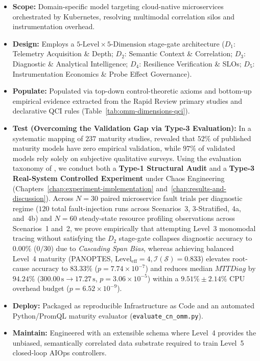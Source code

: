 \begin{itemize}
    \item \textbf{Scope:} Domain-specific model targeting cloud-native microservices orchestrated by Kubernetes, resolving multimodal correlation silos and instrumentation overhead.
    \item \textbf{Design:} Employs a $5\text{-Level} \times 5\text{-Dimension}$ stage-gate architecture ($D_1$: Telemetry Acquisition \& Depth; $D_2$: Semantic Context \& Correlation; $D_3$: Diagnostic \& Analytical Intelligence; $D_4$: Resilience Verification \& SLOs; $D_5$: Instrumentation Economics \& Probe Effect Governance).
    \item \textbf{Populate:} Populated via top-down control-theoretic axioms \cite{kalman_1960} and bottom-up empirical evidence extracted from the Rapid Review primary studies and declarative QCI rules (Table~\ref{tab:omm-dimensions-qci}).
    \item \textbf{Test (Overcoming the Validation Gap via Type-3 Evaluation):} In a systematic mapping of $237$ maturity studies,  revealed that $52\%$ of published maturity models have zero empirical validation, while $97\%$ of validated models rely solely on subjective qualitative surveys. Using the evaluation taxonomy of , we conduct both a \textbf{Type-1 Structural Audit} and a \textbf{Type-3 Real-System Controlled Experiment} under Chaos Engineering (Chapters~\ref{chap:experiment-implementation} and~\ref{chap:results-and-discussion}). Across $N=30$ paired microservice fault trials per diagnostic regime ($120$ total fault-injection runs across Scenarios~3, 3-Stratified, 4a, and~4b) and $N=60$ steady-state resource profiling observations across Scenarios~1 and~2, we prove empirically that attempting Level~3 monomodal tracing without satisfying the $D_2$ stage-gate collapses diagnostic accuracy to $0.00\%$ ($0/30$) due to \textit{Cascading Span Bias}, whereas achieving balanced Level~4 maturity (PANOPTES, $\text{Level}_{\text{eff}} = 4, \mathcal{I}(\mathcal{S}) = 0.833$) elevates root-cause accuracy to $83.33\%$ ($p = 7.74 \times 10^{-7}$) and reduces median $MTTDiag$ by $94.24\%$ ($300.00\,\text{s} \rightarrow 17.27\,\text{s}$, $p = 3.06 \times 10^{-5}$) within a $9.51\% \pm 2.14\%$ CPU overhead budget ($p = 6.52 \times 10^{-9}$).
    \item \textbf{Deploy:} Packaged as reproducible Infrastructure as Code and an automated Python/PromQL maturity evaluator (\texttt{evaluate\_cn\_omm.py}).
    \item \textbf{Maintain:} Engineered with an extensible schema where Level~4 provides the unbiased, semantically correlated data substrate required to train Level~5 closed-loop AIOps controllers.
\end{itemize}

